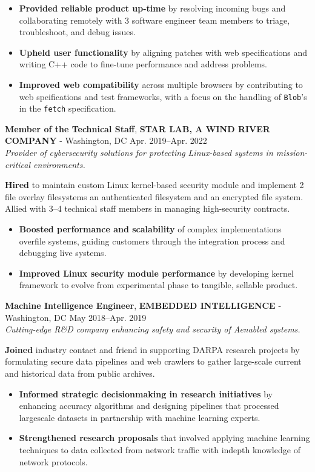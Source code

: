 \documentclass[a4paper,skipsamekey,11pt,english]{curve}
\newcommand{\makeWorkHistoryTitle}[5]{
  \begin{tcolorbox}[colback=base1!10,colframe=base1!10,frame hidden]
    {\color{blue}\textbf{#1}}, \textbf{#2} - #3 \hfill #4\\
    {\small\textit{#5}}
  \end{tcolorbox}
}
\begin{document}
  \begin{itemize}
    \item \textbf{Provided reliable product up-time} by resolving incoming bugs
    and collaborating remotely with 3 software engineer team members to triage,
    troubleshoot, and debug issues.
    \item \textbf{Upheld user functionality} by aligning patches with web
    specifications and writing C++ code to fine-tune performance and address
    problems.
    \item \textbf{Improved web compatibility} across multiple browsers by
    contributing to web speifications and test frameworks, with a focus on
    the handling of \texttt{Blob}'s in the \texttt{fetch} specification.
  \end{itemize}

  \makeWorkHistoryTitle
    {Member of the Technical Staff}
    {STAR LAB, A WIND RIVER COMPANY}
    {Washington, DC}
    {Apr. 2019–Apr. 2022}
    {
      Provider of cybersecurity solutions for protecting Linux-based systems
      in mission-critical environments.
    }
  \textbf{Hired} to maintain custom Linux kernel-based security module and
  implement 2 file overlay filesystems an authenticated filesystem and an
  encrypted file system. Allied with 3–4 technical staff members in managing
  high-security contracts.

  \begin{itemize}
    \item \textbf{Boosted performance and scalability} of complex
    implementations overfile systems, guiding customers through the
    integration process and debugging live systems.
    \item \textbf{Improved Linux security module performance} by developing
    kernel framework to evolve from experimental phase to tangible,
    sellable product.
  \end{itemize}

  \makeWorkHistoryTitle
    {Machine Intelligence Engineer}
    {EMBEDDED INTELLIGENCE}
    {Washington, DC}
    {May 2018–Apr. 2019}
    {
      Cutting-edge R\&D company enhancing safety and security of
      A\-enabled systems.
    }
  \textbf{Joined} industry contact and friend in supporting DARPA research
  projects by formulating secure data pipelines and web crawlers to gather
  large-scale current and historical data from public archives.

  \begin{itemize}
    \item \textbf{Informed strategic decision\-making in research initiatives}
    by enhancing accuracy algorithms and designing pipelines that processed
    large\-scale datasets in partnership with machine learning experts.
    \item \textbf{Strengthened research proposals} that involved applying
    machine learning techniques to data collected from network traffic
    with in\-depth knowledge of network protocols.
  \end{itemize}
\end{document}
